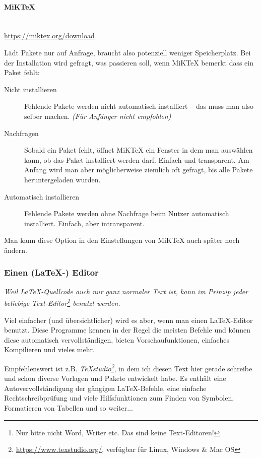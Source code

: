 			\paragraph{MiKTeX}~\\
			  
			\hfill
			\url{https://miktex.org/download}
			
			\noindent Lädt Pakete nur auf Anfrage, braucht also potenziell weniger Speicherplatz.
			Bei der Installation wird gefragt, was passieren soll, wenn MiKTeX bemerkt dass ein Paket fehlt:
			\begin{description}
				\item[Nicht installieren] Fehlende Pakete werden nicht automatisch installiert -- das muss man also selber machen. \textit{(Für Anfänger nicht empfohlen)}
				\item[Nachfragen] Sobald ein Paket fehlt, öffnet MiKTeX ein Fenster in dem man auswählen kann, ob das Paket installiert werden darf. Einfach und transparent. Am Anfang wird man aber möglicherweise ziemlich oft gefragt, bis alle Pakete heruntergeladen wurden.
				\item[Automatisch installieren] Fehlende Pakete werden ohne Nachfrage beim Nutzer automatisch installiert. Einfach, aber intransparent.
			\end{description}
			
			Man kann diese Option in den Einstellungen von MiKTeX auch später noch ändern.
			
			\subsubsection{Einen (LaTeX-) Editor}
			\emph{Weil \LaTeX-Quellcode auch nur ganz normaler Text ist, kann im Prinzip jeder beliebige Text-Editor\footnote{Nur bitte nicht Word, Writer etc. Das sind keine Text-Editoren!} benutzt werden.}
			\medskip
			
			Viel einfacher (und übersichtlicher) wird es aber, wenn man einen \LaTeX-Editor benutzt.
			Diese Programme kennen in der Regel die meisten Befehle und können diese automatisch vervollständigen, bieten Vorschaufunktionen, einfaches Kompilieren und vieles mehr.
			
			
			Empfehlenswert ist z.B. \emph{TeXstudio\footnote{\url{https://www.texstudio.org/}, verfügbar für Linux, Windows \& Mac OS}}, in dem ich diesen Text hier gerade schreibe und schon diverse Vorlagen und Pakete entwickelt habe. Es enthält eine Autovervollständigung der gängigen \LaTeX-Befehle, eine einfache Rechtschreibprüfung und viele Hilfsfunktionen zum Finden von Symbolen, Formatieren von Tabellen und so weiter...
			\medskip
			
